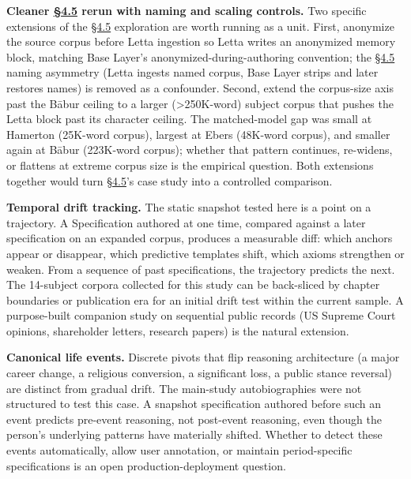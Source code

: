\textbf{Cleaner \hyperref[exploratory-case-study-letta-stateful-agent-n3-post-hoc]{§4.5} rerun with naming and scaling controls.} Two
specific extensions of the \hyperref[exploratory-case-study-letta-stateful-agent-n3-post-hoc]{§4.5} exploration are worth running as a unit.
First, anonymize the source corpus before Letta ingestion so Letta
writes an anonymized memory block, matching Base Layer's
anonymized-during-authoring convention; the \hyperref[exploratory-case-study-letta-stateful-agent-n3-post-hoc]{§4.5} naming asymmetry (Letta
ingests named corpus, Base Layer strips and later restores names) is
removed as a confounder. Second, extend the corpus-size axis past the
Bābur ceiling to a larger (\textgreater250K-word) subject corpus that
pushes the Letta block past its character ceiling. The matched-model gap
was small at Hamerton (25K-word corpus), largest at Ebers (48K-word
corpus), and smaller again at Bābur (223K-word corpus); whether that
pattern continues, re-widens, or flattens at extreme corpus size is the
empirical question. Both extensions together would turn \hyperref[exploratory-case-study-letta-stateful-agent-n3-post-hoc]{§4.5}'s case
study into a controlled comparison.

\textbf{Temporal drift tracking.} The static snapshot tested here is a
point on a trajectory. A Specification authored at one time, compared
against a later specification on an expanded corpus, produces a
measurable diff: which anchors appear or disappear, which predictive
templates shift, which axioms strengthen or weaken. From a sequence of
past specifications, the trajectory predicts the next. The 14-subject
corpora collected for this study can be back-sliced by chapter
boundaries or publication era for an initial drift test within the
current sample. A purpose-built companion study on sequential public
records (US Supreme Court opinions, shareholder letters, research
papers) is the natural extension.

\textbf{Canonical life events.} Discrete pivots that flip reasoning
architecture (a major career change, a religious conversion, a
significant loss, a public stance reversal) are distinct from gradual
drift. The main-study autobiographies were not structured to test this
case. A snapshot specification authored before such an event predicts
pre-event reasoning, not post-event reasoning, even though the person's
underlying patterns have materially shifted. Whether to detect these
events automatically, allow user annotation, or maintain period-specific
specifications is an open production-deployment question.

